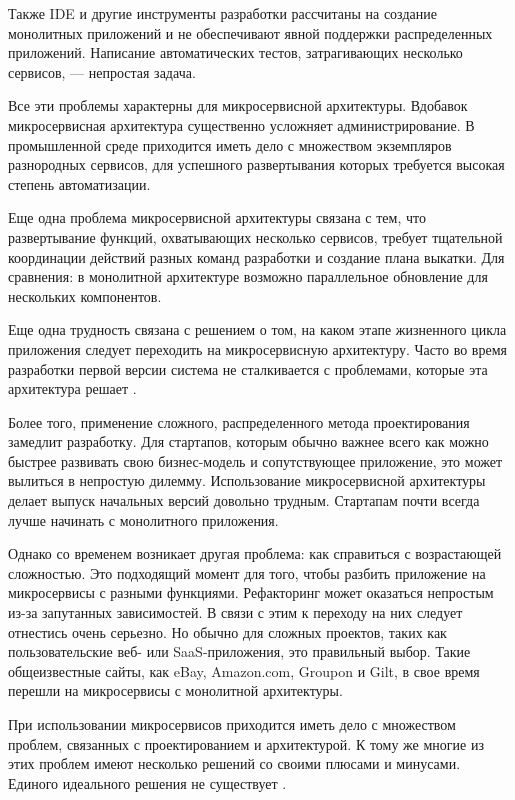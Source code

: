 Также IDE и другие инструменты разработки рассчитаны на создание монолитных
приложений и не обеспечивают явной поддержки распределенных приложений.
Написание автоматических тестов, затрагивающих несколько сервисов, — непростая
задача. 

Все эти проблемы характерны для микросервисной архитектуры. 
Вдобавок микросервисная архитектура существенно усложняет администрирование. В промышленной среде приходится иметь дело с множеством экземпляров
разнородных сервисов, для успешного развертывания которых требуется
высокая степень автоматизации.

Еще одна проблема микросервисной архитектуры связана с тем, что развертывание
функций, охватывающих несколько сервисов, требует тщательной координации
действий разных команд разработки и создание плана выкатки. Для сравнения: в монолитной архитектуре возможно параллельное обновление для нескольких компонентов.

Еще одна трудность связана с решением о том, на каком этапе жизненного цикла
приложения следует переходить на микросервисную архитектуру. Часто во время
разработки первой версии система не сталкивается с проблемами, которые эта
архитектура решает \cite{kaban}. 

Более того, применение сложного, распределенного метода
проектирования замедлит разработку. Для стартапов, которым обычно важнее всего
как можно быстрее развивать свою бизнес-модель и сопутствующее приложение, это
может вылиться в непростую дилемму. Использование микросервисной архитектуры делает выпуск начальных версий довольно трудным. Стартапам почти всегда
лучше начинать с монолитного приложения.

Однако со временем возникает другая проблема: как справиться с возрастающей сложностью. Это подходящий момент для того, чтобы разбить приложение
на микросервисы с разными функциями. Рефакторинг может оказаться непростым
из-за запутанных зависимостей. В связи с этим к переходу на них следует отнестись очень серьезно. Но обычно для сложных проектов, таких как пользовательские веб- или
SaaS-приложения, это правильный выбор. Такие общеизвестные сайты, как eBay, Amazon.com, Groupon и Gilt, в свое время перешли на микросервисы с монолитной архитектуры.

При использовании микросервисов приходится иметь дело с множеством проблем, связанных с проектированием и архитектурой.
К тому же многие из этих
проблем имеют несколько решений со своими плюсами и минусами. Единого
идеального решения не существует \cite{micro-1}.